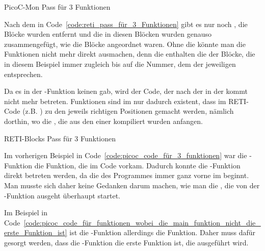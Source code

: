 \begin{code}
  \centering
  \caption{PicoC-Mon Pass für 3 Funktionen}
  \label{code:picoc_mon_pass_für_3_Funktionen}
\end{code}

Nach dem  in Code~\ref{code:reti_pass_für_3_Funktionen} gibt es nur noch , die Blöcke wurden entfernt und die  in diesen Blöcken wurden genauso zusammengefügt, wie die Blöcke angeordnet waren. Ohne die  könnte man die Funktionen nicht mehr direkt ausmachen, denn die  enthalten die   der Blöcke, die in diesem Beispiel immer zugleich bis auf die Nummer, dem  der jeweiligen  entsprechen.

Da es in der -Funktion keinen  gab, wird der Code, der nach der  in der  kommt nicht mehr betreten. Funktionen sind im  nur dadurch existent, dass im RETI-Code  (z.B. ) zu den jeweils richtigen Positionen gemacht werden, nämlich dorthin, wo die , die aus den  einer  kompiliert wurden anfangen.

\begin{code}
  \centering
  \caption{RETI-Blocks Pass für 3 Funktionen}
  \label{code:reti_pass_für_3_Funktionen}
\end{code}


Im vorherigen Beispiel in Code~\ref{code:picoc_code_für_3_funktionen} war die -Funktion die  Funktion, die im Code vorkam. Dadurch konnte die -Funktion direkt betreten werden, da die  des Programmes immer ganz vorne im  beginnt. Man musste sich daher keine Gedanken darum machen, wie man die , die von der -Funktion ausgeht überhaupt startet.

Im Beispiel in Code~\ref{code:picoc_code_für_funktionen_wobei_die_main_funktion_nicht_die_erste_Funktion_ist} ist die -Funktion allerdings  die  Funktion. Daher muss dafür gesorgt werden, dass die -Funktion die erste Funktion ist, die ausgeführt wird.

